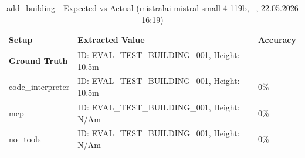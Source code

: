 \documentclass[a4paper,11pt]{article}
\begin{document}
\begin{table}[H]
\centering
\scriptsize
\caption{add\_building - Detailed Runs Comparison (mistralai-mistral-small-4-119b, --, 22.05.2026 16:19)}
\end{table}

\begin{table}[H]
\centering
\scriptsize
\caption{add\_building - Expected vs Actual (mistralai-mistral-small-4-119b, --, 22.05.2026 16:19)}
\begin{tabular}{l l l}
\toprule
Setup & Extracted Value & Accuracy \\
\midrule
\textbf{Ground Truth} & ID: EVAL\_TEST\_BUILDING\_001, Height: 10.5m & -- \\
\midrule
code\_interpreter & ID: EVAL\_TEST\_BUILDING\_001, Height: 10.5m & 0\% \\
mcp & ID: EVAL\_TEST\_BUILDING\_001, Height: N/Am & 0\% \\
no\_tools & ID: EVAL\_TEST\_BUILDING\_001, Height: N/Am & 0\% \\
\bottomrule
\end{tabular}
\end{table}

\clearpage
\end{document}
